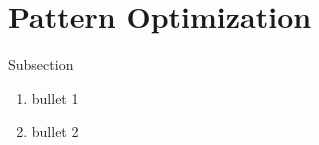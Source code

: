 \section{Pattern Optimization}
\begin{frame}{Subsection}
    \begin{enumerate}
           \item bullet 1
    \pause \item bullet 2
    \end{enumerate}
\end{frame}
